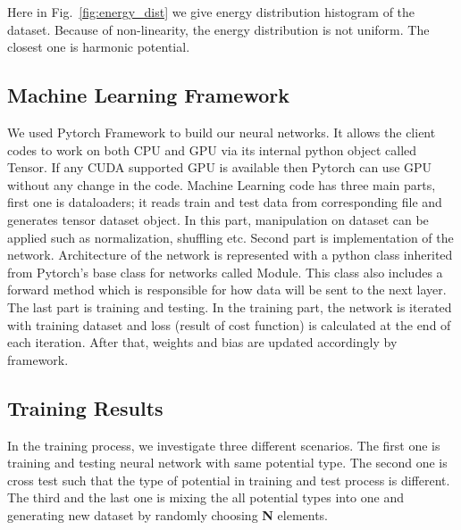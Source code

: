 \documentclass[a4paper,times,hidelinks,12pt]{article}
\begin{document}
Here in Fig.~\ref{fig:energy_dist} we give energy distribution histogram of the dataset. Because of non-linearity, the energy distribution is not uniform. The closest one is harmonic potential.


\subsection{Machine Learning Framework}

We used Pytorch Framework \cite{paszke2017automatic} to build our neural networks. It allows the client codes to work on both CPU and GPU via its internal python object called Tensor. If any CUDA supported GPU is available then Pytorch can use GPU without any change in the code. Machine Learning code has three main parts, first one is dataloaders; it reads train and test data from corresponding file and generates tensor dataset object. In this part, manipulation on dataset can be applied such as normalization, shuffling etc. Second part is implementation of the network. Architecture of the network is represented with a python class inherited from Pytorch's base class for networks called Module. This class also includes a forward method which is responsible for how data will be sent to the next layer. The last part is training and testing. In the training part, the network is iterated with training dataset and loss (result of cost function) is calculated at the end of each iteration. After that, weights and bias are updated accordingly by framework.

\subsection{Training Results}
\label{sec:training_results}

In the training process, we investigate three different scenarios. The first one is training and testing neural network with same potential type. The second one is cross test such that the type of potential in training and test process is different. The third and the last one is mixing the all potential types into one and generating new dataset by randomly choosing \textbf{N} elements.
\end{document}
